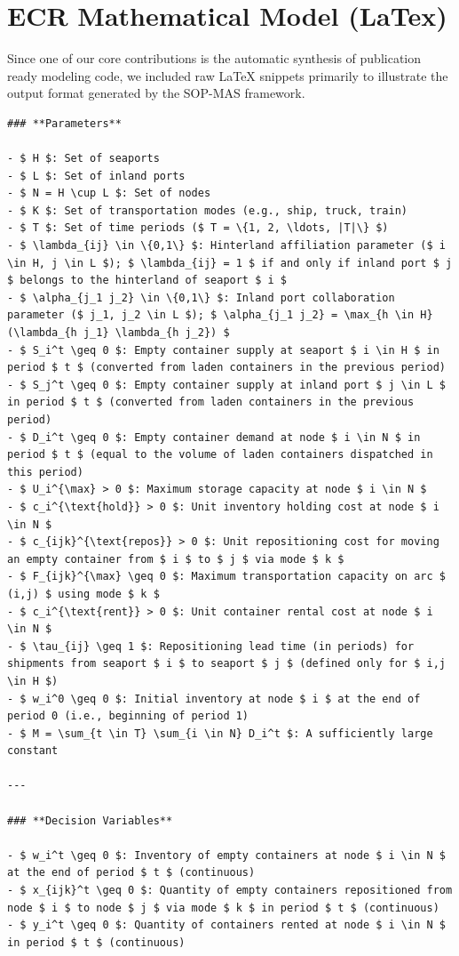 \documentclass[preprint,12pt]{elsarticle}
\begin{document}
\newpage

\section{ECR Mathematical Model (LaTex)}\label{app3}
Since one of our core contributions is the automatic synthesis of publication ready modeling code, we included raw LaTeX snippets primarily to illustrate the output format generated by the SOP-MAS framework.
\begin{lstlisting}
### **Parameters**

- $ H $: Set of seaports
- $ L $: Set of inland ports
- $ N = H \cup L $: Set of nodes
- $ K $: Set of transportation modes (e.g., ship, truck, train)
- $ T $: Set of time periods ($ T = \{1, 2, \ldots, |T|\} $)
- $ \lambda_{ij} \in \{0,1\} $: Hinterland affiliation parameter ($ i \in H, j \in L $); $ \lambda_{ij} = 1 $ if and only if inland port $ j $ belongs to the hinterland of seaport $ i $
- $ \alpha_{j_1 j_2} \in \{0,1\} $: Inland port collaboration parameter ($ j_1, j_2 \in L $); $ \alpha_{j_1 j_2} = \max_{h \in H} (\lambda_{h j_1} \lambda_{h j_2}) $
- $ S_i^t \geq 0 $: Empty container supply at seaport $ i \in H $ in period $ t $ (converted from laden containers in the previous period)
- $ S_j^t \geq 0 $: Empty container supply at inland port $ j \in L $ in period $ t $ (converted from laden containers in the previous period)
- $ D_i^t \geq 0 $: Empty container demand at node $ i \in N $ in period $ t $ (equal to the volume of laden containers dispatched in this period)
- $ U_i^{\max} > 0 $: Maximum storage capacity at node $ i \in N $
- $ c_i^{\text{hold}} > 0 $: Unit inventory holding cost at node $ i \in N $
- $ c_{ijk}^{\text{repos}} > 0 $: Unit repositioning cost for moving an empty container from $ i $ to $ j $ via mode $ k $
- $ F_{ijk}^{\max} \geq 0 $: Maximum transportation capacity on arc $ (i,j) $ using mode $ k $
- $ c_i^{\text{rent}} > 0 $: Unit container rental cost at node $ i \in N $
- $ \tau_{ij} \geq 1 $: Repositioning lead time (in periods) for shipments from seaport $ i $ to seaport $ j $ (defined only for $ i,j \in H $)
- $ w_i^0 \geq 0 $: Initial inventory at node $ i $ at the end of period 0 (i.e., beginning of period 1)
- $ M = \sum_{t \in T} \sum_{i \in N} D_i^t $: A sufficiently large constant

---

### **Decision Variables**

- $ w_i^t \geq 0 $: Inventory of empty containers at node $ i \in N $ at the end of period $ t $ (continuous)
- $ x_{ijk}^t \geq 0 $: Quantity of empty containers repositioned from node $ i $ to node $ j $ via mode $ k $ in period $ t $ (continuous)
- $ y_i^t \geq 0 $: Quantity of containers rented at node $ i \in N $ in period $ t $ (continuous)


\end{lstlisting}
\end{document}
